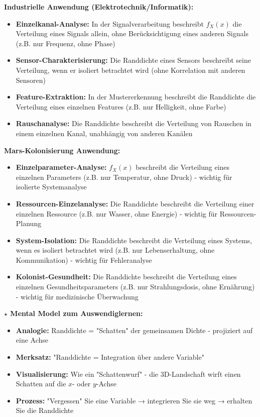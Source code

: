 \begin{denoobification}
\textbf{Industrielle Anwendung (Elektrotechnik/Informatik):}
\begin{itemize}
    \item \textbf{Einzelkanal-Analyse:} In der Signalverarbeitung beschreibt $f_X(x)$ die Verteilung eines Signals allein, ohne Berücksichtigung eines anderen Signals (z.B. nur Frequenz, ohne Phase)
    \item \textbf{Sensor-Charakterisierung:} Die Randdichte eines Sensors beschreibt seine Verteilung, wenn er isoliert betrachtet wird (ohne Korrelation mit anderen Sensoren)
    \item \textbf{Feature-Extraktion:} In der Mustererkennung beschreibt die Randdichte die Verteilung eines einzelnen Features (z.B. nur Helligkeit, ohne Farbe)
    \item \textbf{Rauschanalyse:} Die Randdichte beschreibt die Verteilung von Rauschen in einem einzelnen Kanal, unabhängig von anderen Kanälen
\end{itemize}

\textbf{Mars-Kolonisierung Anwendung:}
\begin{itemize}
    \item \textbf{Einzelparameter-Analyse:} $f_X(x)$ beschreibt die Verteilung eines einzelnen Parameters (z.B. nur Temperatur, ohne Druck) - wichtig für isolierte Systemanalyse
    \item \textbf{Ressourcen-Einzelanalyse:} Die Randdichte beschreibt die Verteilung einer einzelnen Ressource (z.B. nur Wasser, ohne Energie) - wichtig für Ressourcen-Planung
    \item \textbf{System-Isolation:} Die Randdichte beschreibt die Verteilung eines Systems, wenn es isoliert betrachtet wird (z.B. nur Lebenserhaltung, ohne Kommunikation) - wichtig für Fehleranalyse
    \item \textbf{Kolonist-Gesundheit:} Die Randdichte beschreibt die Verteilung eines einzelnen Gesundheitsparameters (z.B. nur Strahlungsdosis, ohne Ernährung) - wichtig für medizinische Überwachung
\end{itemize}

\textbf{$\star$ Mental Model zum Auswendiglernen:}
\begin{itemize}
    \item \textbf{Analogie:} Randdichte = "Schatten" der gemeinsamen Dichte - projiziert auf eine Achse
    \item \textbf{Merksatz:} "Randdichte = Integration über andere Variable"
    \item \textbf{Visualisierung:} Wie ein "Schattenwurf" - die 3D-Landschaft wirft einen Schatten auf die $x$- oder $y$-Achse
    \item \textbf{Prozess:} "Vergessen" Sie eine Variable → integrieren Sie sie weg → erhalten Sie die Randdichte
\end{itemize}


\end{denoobification}

